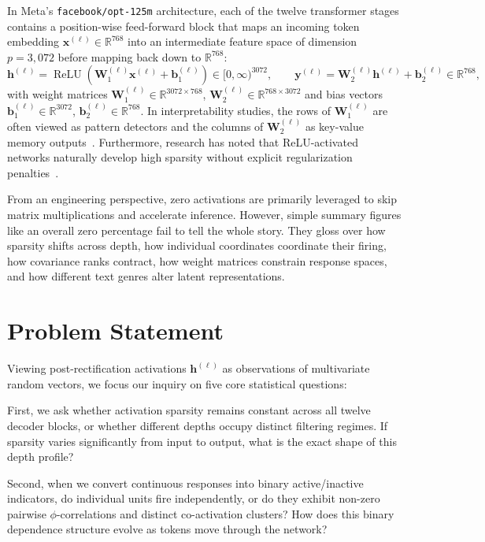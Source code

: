 \documentclass[12pt, a4paper, oneside]{report}
\theoremstyle{definition}
\newcommand{\vect}[1]{\mathbf{#1}}
\newcommand{\mat}[1]{\mathbf{#1}}
\newcommand{\R}{\mathbb{R}}
\begin{document}
In Meta's \texttt{facebook/opt-125m} architecture, each of the twelve transformer stages contains a position-wise feed-forward block that maps an incoming token embedding $\vect{x}^{(\ell)} \in \R^{768}$ into an intermediate feature space of dimension $p = 3{,}072$ before mapping back down to $\R^{768}$:
\begin{equation}
    \vect{h}^{(\ell)} = \operatorname{ReLU}\!\left(\mat{W}_1^{(\ell)} \vect{x}^{(\ell)} + \vect{b}_1^{(\ell)}\right) \in [0, \infty)^{3072},
    \qquad
    \vect{y}^{(\ell)} = \mat{W}_2^{(\ell)} \vect{h}^{(\ell)} + \vect{b}_2^{(\ell)} \in \R^{768},
    \label{eq:ffn_mapping}
\end{equation}
with weight matrices $\mat{W}_1^{(\ell)} \in \R^{3072 \times 768}$, $\mat{W}_2^{(\ell)} \in \R^{768 \times 3072}$ and bias vectors $\vect{b}_1^{(\ell)} \in \R^{3072}$, $\vect{b}_2^{(\ell)} \in \R^{768}$. In interpretability studies, the rows of $\mat{W}_1^{(\ell)}$ are often viewed as pattern detectors and the columns of $\mat{W}_2^{(\ell)}$ as key-value memory outputs~\cite{geva2021transformer}. Furthermore, research has noted that ReLU-activated networks naturally develop high sparsity without explicit regularization penalties~\cite{li2023emergence}.

From an engineering perspective, zero activations are primarily leveraged to skip matrix multiplications and accelerate inference. However, simple summary figures like an overall zero percentage fail to tell the whole story. They gloss over how sparsity shifts across depth, how individual coordinates coordinate their firing, how covariance ranks contract, how weight matrices constrain response spaces, and how different text genres alter latent representations.

\section{Problem Statement}

Viewing post-rectification activations $\vect{h}^{(\ell)}$ as observations of multivariate random vectors, we focus our inquiry on five core statistical questions:

First, we ask whether activation sparsity remains constant across all twelve decoder blocks, or whether different depths occupy distinct filtering regimes. If sparsity varies significantly from input to output, what is the exact shape of this depth profile?

Second, when we convert continuous responses into binary active/inactive indicators, do individual units fire independently, or do they exhibit non-zero pairwise $\phi$-correlations and distinct co-activation clusters? How does this binary dependence structure evolve as tokens move through the network?
\end{document}
